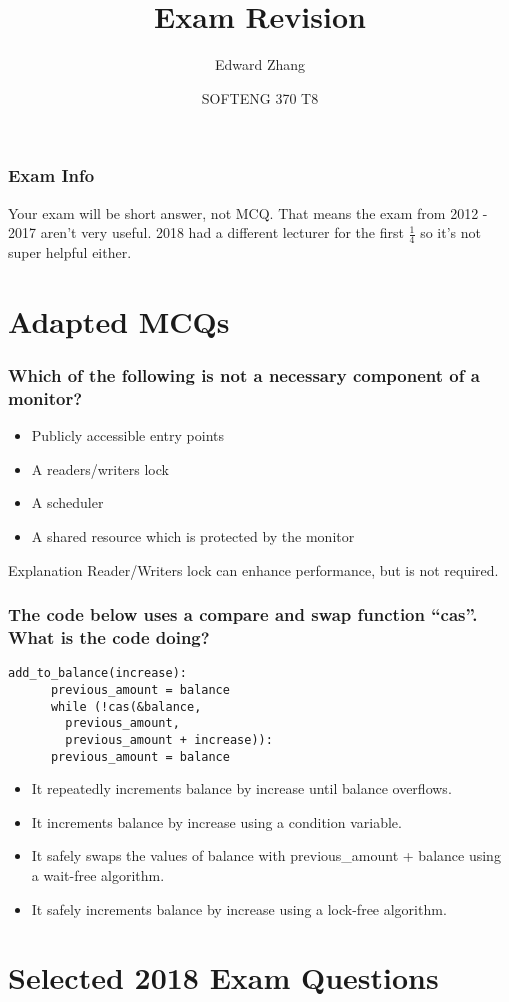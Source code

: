 \documentclass{beamer}
\title[SOFTENG 370 Tutorial 9 (2019)] %
{Exam Revision}
\author{Edward Zhang}
\date[October 2019] %
{SOFTENG 370 T8}
\begin{document}
\frame{\titlepage}
\begin{frame}
  \frametitle{Exam Info}
  Your exam will be short answer, not MCQ. That means the exam from 2012 - 2017 aren't very useful. 2018 had a different lecturer for the first $\frac{1}{4}$ so it's not super helpful either.\\
\end{frame}
\section{Adapted MCQs}
\begin{frame}
  \frametitle{Which of the following is not a necessary component of a monitor?}
  \begin{itemize}
    \item Publicly accessible entry points
    \item<alert@2> A readers/writers lock
    \item A scheduler
    \item A shared resource which is protected by the monitor
  \end{itemize}
  \pause
  \begin{block}{Explanation}
    Reader/Writers lock can enhance performance, but is not required.
  \end{block}
\end{frame}
\begin{frame}[fragile]
  \frametitle{The code below uses a compare and swap function “cas”. What is the code doing?}
  \begin{lstlisting}[style=customc]
    add_to_balance(increase):
      previous_amount = balance
      while (!cas(&balance,
        previous_amount,
        previous_amount + increase)):
      previous_amount = balance
  \end{lstlisting}
  \begin{itemize}
    \item It repeatedly increments balance by increase until balance overflows.
    \item It increments balance by increase using a condition variable.
    \item It safely swaps the values of balance with previous\_amount + balance using a wait-free algorithm.
    \item<alert@2> It safely increments balance by increase using a lock-free algorithm.
  \end{itemize}
\end{frame}
\section{Selected 2018 Exam Questions}
\end{document}
